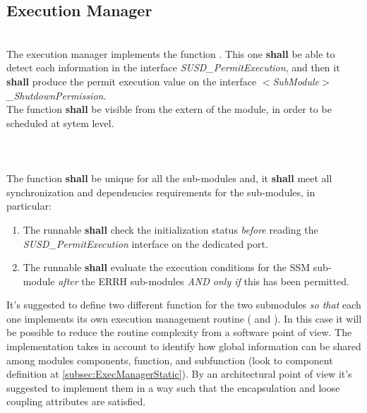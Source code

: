 \subsection{Execution Manager}
\label{sec:ExecManagerDynamic}
\\
The execution manager implements the function . 
This one \textbf{shall} be able to detect each information in the interface \textit{SUSD_PermitExecution}, and then it \textbf{shall} produce the permit execution value on the interface \textit{$<$SubModule$>$_ShutdownPermission}.
\\
The function  \textbf{shall} be visible from the extern of the module, in order to be scheduled at sytem level.
\\
{  }
\\
\\
\\
The function  \textbf{shall} be unique for all the sub-modules and, it \textbf{shall} meet all synchronization and dependencies requirements for the sub-modules, in particular:
\begin{enumerate}
    \item The runnable \textbf{shall} check the initialization status \textit{before} reading the \textit{SUSD_PermitExecution} interface on the dedicated port.
    \item The runnable \textbf{shall} evaluate the execution conditions for the SSM sub-module \textit{after} the ERRH sub-modules \textit{AND only if} this has been permitted.
\end{enumerate}
{ }

It's suggested to define two different function for the two submodules \textit{so that} each one implements its own execution management routine ( and ).
In this case it will be possible to reduce the routine complexity from a software point of view. The implementation takes in account to identify how global information can be shared among modules components, function, and subfunction (look to component definition at \ref{subsec:ExecManagerStatic}). By an architectural point of view it's suggested to implement them in a way such that the
encapsulation and loose coupling attributes are satisfied.

